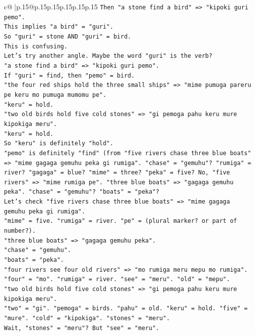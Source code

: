 \documentclass{article}
\begin{document}
{\begin{supertabular}{c@{$\;$}|p{.15\linewidth}@{}p{.15\linewidth}p{.15\linewidth}p{.15\linewidth}p{.15\linewidth}p{.15\linewidth}}
{{{\texttt{Then "a stone find a bird" => "kipoki guri pemo".} \\
\texttt{This implies "a bird" = "guri".} \\
\texttt{So "guri" = stone AND "guri" = bird.} \\
\texttt{This is confusing.} \\
\texttt{Let's try another angle. Maybe the word "guri" is the verb?} \\
\texttt{"a stone find a bird" => "kipoki guri pemo".} \\
\texttt{If "guri" = find, then "pemo" = bird.} \\
\texttt{"the four red ships hold the three small ships" => "mime pumuga pareru pe keru mo pumuga mumomu pe".} \\
\texttt{"keru" = hold.} \\
\texttt{"two old birds hold five cold stones" => "gi pemoga pahu keru mure kipokiga meru".} \\
\texttt{"keru" = hold.} \\
\texttt{So "keru" is definitely "hold".} \\
\texttt{"pemo" is definitely "find" (from "five rivers chase three blue boats" => "mime gagaga gemuhu peka gi rumiga". "chase" = "gemuhu"? "rumiga" = river? "gagaga" = blue? "mime" = three? "peka" = five? No, "five rivers" => "mime rumiga pe". "three blue boats" => "gagaga gemuhu peka". "chase" = "gemuhu"? "boats" = "peka"?} \\
\texttt{Let's check "five rivers chase three blue boats" => "mime gagaga gemuhu peka gi rumiga".} \\
\texttt{"mime" = five. "rumiga" = river. "pe" = (plural marker? or part of number?).} \\
\texttt{"three blue boats" => "gagaga gemuhu peka".} \\
\texttt{"chase" = "gemuhu".} \\
\texttt{"boats" = "peka".} \\
\texttt{"four rivers see four old rivers" => "mo rumiga meru mepu mo rumiga".} \\
\texttt{"four" = "mo". "rumiga" = river. "see" = "meru". "old" = "mepu".} \\
\texttt{"two old birds hold five cold stones" => "gi pemoga pahu keru mure kipokiga meru".} \\
\texttt{"two" = "gi". "pemoga" = birds. "pahu" = old. "keru" = hold. "five" = "mure". "cold" = "kipokiga". "stones" = "meru".} \\
\texttt{Wait, "stones" = "meru"? But "see" = "meru".} \\
}}}
\end{supertabular}}
\end{document}
